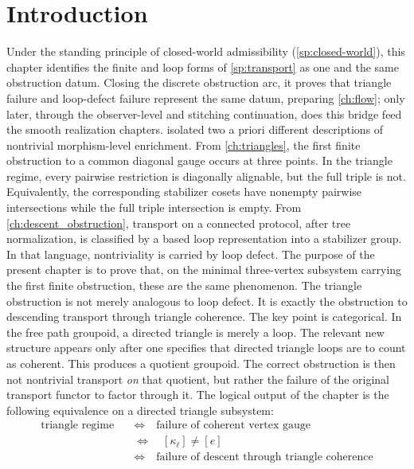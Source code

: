 \section{Introduction}
Under the standing principle of closed-world admissibility
(\cref{sp:closed-world}), this chapter identifies the finite and loop
forms of \cref{sp:transport} as one and the same obstruction datum.
Closing the discrete obstruction arc, it proves that triangle failure
and loop-defect failure represent the same datum, preparing
\cref{ch:flow}; only later, through the observer-level and stitching
continuation, does this bridge feed the smooth realization chapters.
 isolated two a priori
different descriptions of
nontrivial morphism-level enrichment.
From \cref{ch:triangles}, the first finite obstruction to a common
diagonal gauge occurs at three points. In the triangle regime, every
pairwise restriction is diagonally alignable, but the full triple is
not. Equivalently, the corresponding stabilizer cosets have nonempty
pairwise intersections while the full triple intersection is empty.
From \cref{ch:descent_obstruction}, transport on a connected protocol,
after tree normalization, is classified by a based loop representation
into a stabilizer group. In that language, nontriviality is carried by
loop defect.
The purpose of the present chapter is to prove that, on the minimal
three-vertex subsystem carrying the first finite obstruction, these are
the same phenomenon. The triangle obstruction is not merely analogous
to loop defect. It is exactly the obstruction to descending transport
through triangle coherence.
The key point is categorical. In the free path groupoid, a directed
triangle is merely a loop. The relevant new structure appears only
after one specifies that directed triangle loops are to count as
coherent. This produces a quotient groupoid. The correct obstruction
is then not nontrivial transport \emph{on} that quotient, but rather the
failure of the original transport functor to factor through it.
The logical output of the chapter is the following equivalence on a
directed triangle subsystem:
\begin{align*}
	\text{triangle regime} & \quad\Longleftrightarrow\quad \text{failure of coherent vertex gauge}              \\
	                       & \quad\Longleftrightarrow\quad [\kappa_\ell] \neq [e]                               \\
	                       & \quad\Longleftrightarrow\quad \text{failure of descent through triangle coherence}
\end{align*}

